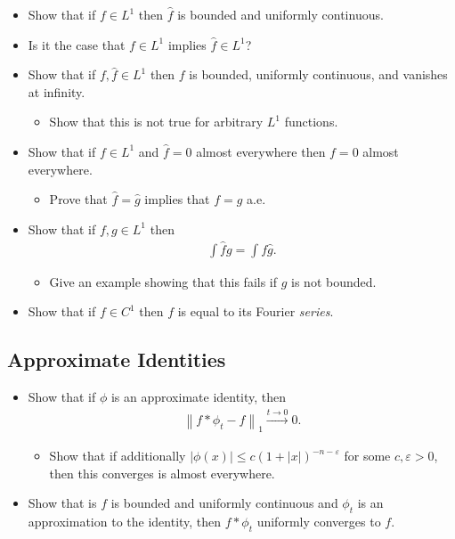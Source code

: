 \begin{itemize}
\tightlist
\item
  Show that if \(f\in L^1\) then \(\widehat{f}\) is bounded and
  uniformly continuous.
\item
  Is it the case that \(f\in L^1\) implies \(\widehat{f}\in L^1\)?
\item
  Show that if \(f, \widehat{f} \in L^1\) then \(f\) is bounded,
  uniformly continuous, and vanishes at infinity.

  \begin{itemize}
  \tightlist
  \item
    Show that this is not true for arbitrary \(L^1\) functions.
  \end{itemize}
\item
  Show that if \(f\in L^1\) and \(\widehat{f} = 0\) almost everywhere
  then \(f = 0\) almost everywhere.

  \begin{itemize}
  \tightlist
  \item
    Prove that \(\widehat{f} = \widehat{g}\) implies that \(f=g\) a.e.
  \end{itemize}
\item
  Show that if \(f, g \in L^1\) then
  \begin{align*}\int \widehat{f} g = \int f\widehat{g}.\end{align*}

  \begin{itemize}
  \tightlist
  \item
    Give an example showing that this fails if \(g\) is not bounded.
  \end{itemize}
\item
  Show that if \(f\in C^1\) then \(f\) is equal to its Fourier
  \emph{series}.
\end{itemize}

\hypertarget{approximate-identities}{%
\subsection{Approximate Identities}\label{approximate-identities}}

\begin{itemize}
\tightlist
\item
  Show that if \(\phi\) is an approximate identity, then
  \begin{align*}{\left\lVert {f\ast \phi_t - f} \right\rVert}_1 \overset{t\to 0}\to 0.\end{align*}

  \begin{itemize}
  \tightlist
  \item
    Show that if additionally
    \({\left\lvert {\phi(x)} \right\rvert} \leq c(1 + {\left\lvert {x} \right\rvert})^{-n-{\varepsilon}}\)
    for some \(c,{\varepsilon}>0\), then this converges is almost
    everywhere.
  \end{itemize}
\item
  Show that is \(f\) is bounded and uniformly continuous and \(\phi_t\)
  is an approximation to the identity, then \(f\ast \phi_t\) uniformly
  converges to \(f\).
\end{itemize}

